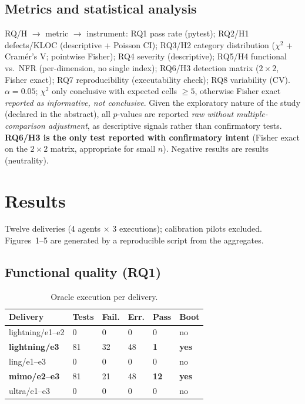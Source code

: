 \documentclass[sigconf,anonymous]{acmart}
\begin{document}
\subsection{Metrics and statistical analysis}
RQ/H $\rightarrow$ metric $\rightarrow$ instrument: RQ1 pass rate (pytest); RQ2/H1 defects/KLOC (descriptive + Poisson CI); RQ3/H2 category distribution ($\chi^2$ + Cram\'er's V; pointwise Fisher); RQ4 severity (descriptive); RQ5/H4 functional vs.\ NFR (per-dimension, no single index); RQ6/H3 detection matrix ($2\times2$, Fisher exact); RQ7 reproducibility (executability check); RQ8 variability (CV). $\alpha=0.05$; $\chi^2$ only conclusive with expected cells $\ge5$, otherwise Fisher exact \emph{reported as informative, not conclusive}. Given the exploratory nature of the study (declared in the abstract), all $p$-values are reported \emph{raw without multiple-comparison adjustment}, as descriptive signals rather than confirmatory tests. \textbf{RQ6/H3 is the only test reported with confirmatory intent} (Fisher exact on the $2\times2$ matrix, appropriate for small $n$). Negative results are results (neutrality).

\section{Results}
Twelve deliveries (4 agents $\times$ 3 executions); calibration pilots excluded. Figures~1--5 are generated by a reproducible script from the aggregates.

\subsection{Functional quality (RQ1)}
\begin{table}[t]
\caption{Oracle execution per delivery.}
\label{tab:rq1}
\small
\begin{tabular}{llllll}
\toprule
\textbf{Delivery} & \textbf{Tests} & \textbf{Fail.} & \textbf{Err.} & \textbf{Pass} & \textbf{Boot}\\
\midrule
lightning/e1--e2 & 0 & 0 & 0 & 0 & no\\
\textbf{lightning/e3} & 81 & 32 & 48 & \textbf{1} & \textbf{yes}\\
ling/e1--e3 & 0 & 0 & 0 & 0 & no\\
\textbf{mimo/e2--e3} & 81 & 21 & 48 & \textbf{12} & \textbf{yes}\\
ultra/e1--e3 & 0 & 0 & 0 & 0 & no\\
\bottomrule
\end{tabular}
\end{table}
\end{document}

